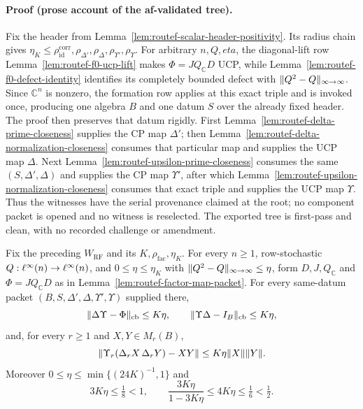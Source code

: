 \paragraph{Proof (prose account of the af-validated tree).}
Fix the header from Lemma~\ref{lem:routef-scalar-header-positivity}.  Its radius chain gives
$\eta_K\le\rho_{\mathrm{id}}^{\mathrm{corr}},\rho_{\Delta'},\rho_\Delta,
\rho_{\Upsilon'},\rho_\Upsilon$.  For arbitrary $n,Q,eta$, the diagonal-lift row
Lemma~\ref{lem:routef-f0-ucp-lift} makes $\Phi=JQ_{\mathbb C}D$ UCP, while
Lemma~\ref{lem:routef-f0-defect-identity} identifies its completely bounded defect with
$\lVert Q^2-Q\rVert_{\infty\to\infty}$.  Since $\mathbb C^n$ is nonzero, the formation row
applies at this exact triple and is invoked once, producing one algebra $B$ and one datum
$S$ over the already fixed header.  The proof then preserves that datum rigidly.  First
Lemma~\ref{lem:routef-delta-prime-closeness} supplies the CP map $\Delta'$; then
Lemma~\ref{lem:routef-delta-normalization-closeness} consumes that particular map and
supplies the UCP map $\Delta$.  Next Lemma~\ref{lem:routef-upsilon-prime-closeness}
consumes the same $(S,\Delta',\Delta)$ and supplies the CP map $\Upsilon'$, after which
Lemma~\ref{lem:routef-upsilon-normalization-closeness} consumes that exact triple and
supplies the UCP map $\Upsilon$.  Thus the witnesses have the serial provenance claimed
at the root; no component packet is opened and no witness is reselected.  The exported
tree is first-pass and clean, with no recorded challenge or amendment.

\begin{lemma}\label{lem:routef-factor-estimate-packet}
Fix the preceding $W_{\mathrm{RF}}$ and its $K,\rho_{\mathrm{fac}},\eta_K$.  For every
$n\ge1$, row-stochastic $Q:\ell^{\infty}(n)\to\ell^{\infty}(n)$, and $0\le\eta\le\eta_K$ with
$\lVert Q^2-Q\rVert_{\infty\to\infty}\le\eta$, form $D,J,Q_{\mathbb C}$ and
$\Phi=JQ_{\mathbb C}D$ as in Lemma~\ref{lem:routef-factor-map-packet}.  For every
same-datum packet $(B,S,\Delta',\Delta,\Upsilon',\Upsilon)$ supplied there,
\[
 \lVert \Delta\Upsilon-\Phi\rVert_{\mathrm{cb}}\le K\eta,
 \qquad \lVert \Upsilon\Delta-I_B\rVert_{\mathrm{cb}}\le K\eta,
\]
and, for every $r\ge1$ and $X,Y\in M_r(B)$,
\[
 \lVert \Upsilon_r(\Delta_rX\,\Delta_rY)-XY\rVert
 \le K\eta\lVert X\rVert\lVert Y\rVert.
\]
Moreover $0\le\eta\le\min\{(24K)^{-1},1\}$ and
\[
 3K\eta\le\tfrac18<1,
 \qquad \frac{3K\eta}{1-3K\eta}\le4K\eta\le\tfrac16<\tfrac12.
\]
\end{lemma}

